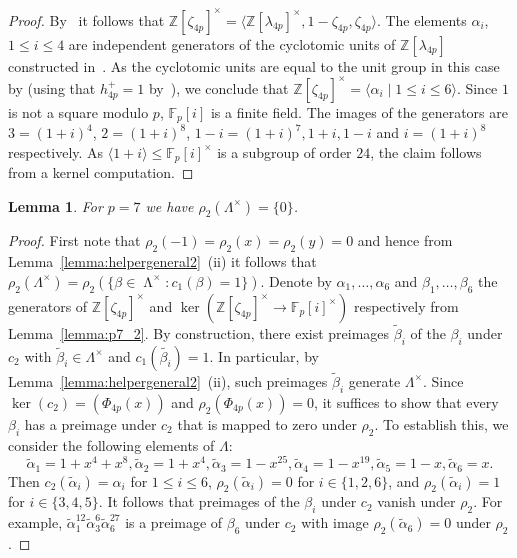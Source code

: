 \documentclass[11pt,leqno,a4paper]{amsart}
\newcommand{\Z}{\mathbb{Z}}
\newcommand{\F}{\mathbb{F}}
\DeclareMathOperator{\LL}{\Lambda}
\newtheorem{lemma}[thm]{Lemma}
\theoremstyle{definition}
\theoremstyle{remark}
\theoremstyle{custom}
\begin{document}
\begin{proof}
By~\cite[Corollary 4.13]{Washington1997} it follows that $\Z[\zeta_{4p}]^\times = \langle \Z[\lambda_{4p}]^\times, 1 - \zeta_{4p}, \zeta_{4p}\rangle$.
The elements $\alpha_i$, $1 \leq i \leq 4$ are independent generators of the cyclotomic units of $\Z[\lambda_{4p}]$ constructed in~\cite{RK1989}. As the cyclotomic units are equal to the unit group in this case by \cite[Theorem]{Sinnott1978} (using that $h_{4p}^+ = 1$ by~\cite{Linden1992}), we conclude that $\Z[\zeta_{4p}]^\times = \langle \alpha_i \mid 1 \leq i \leq 6 \rangle$.
    Since $1$ is not a square modulo $p$, $\F_p[i]$ is a finite field.
    The images of the generators are $3 = (1 + i)^4$, $2 = (1 +i)^8$, $1 - i = (1 + i)^7, 1 +i, 1 -i$ and $i = (1 + i)^8$ respectively. As $\langle 1 + i \rangle \leq \F_p[i]^\times$ is a subgroup of order $24$, the claim follows from a kernel computation.
\end{proof}

\begin{lemma}\label{lemma:rho2units}
  For $p = 7$ we have $\rho_2(\Lambda^\times) = \{0\}$.
\end{lemma}

\begin{proof}
  First note that $\rho_2(-1) = \rho_2(x) = \rho_2(y) = 0$ and hence from Lemma~\ref{lemma:helpergeneral2}~(ii) it follows that $\rho_2(\Lambda^\times) = \rho_2(\{ \beta \in \LL^\times : c_1(\beta) = 1\})$.
  Denote by $\alpha_1,\dotsc,\alpha_6$ and $\beta_1,\dotsc,\beta_6$ the generators of $\Z[\zeta_{4p}]^\times$ and $\ker(\Z[\zeta_{4p}]^\times \to \F_p[i]^\times)$ respectively from Lemma~\ref{lemma:p7_2}.
  By construction, there exist preimages $\tilde \beta_i$ of the $\beta_i$ under $c_2$ with $\tilde \beta_i \in \Lambda^\times$ and $c_1(\tilde{\beta_i}) = 1$. In particular, by Lemma~\ref{lemma:helpergeneral2}~(ii), such preimages $\tilde \beta_i$ generate $\Lambda^\times$.
  Since $\ker(c_2) = (\Phi_{4p}(x))$ and $\rho_2(\Phi_{4p}(x)) = 0$, it suffices to show that every $\beta_i$ has a preimage under $c_2$ that is mapped to zero under $\rho_2$.
  To establish this, we consider the following elements of $\Lambda$:
  \[ \tilde{\alpha}_1 = 1 + x^4 + x^8, \tilde{\alpha}_2 = 1 + x^4, \tilde{\alpha}_3 = 1 - x^{25}, \tilde\alpha_4 = 1 - x^{19}, \tilde\alpha_5 = 1 - x, \tilde{\alpha}_6 = x. \] 
  Then $c_2(\tilde{\alpha}_i) = \alpha_i$ for $1 \leq i \leq 6$, $\rho_2(\tilde{\alpha}_i) = 0$ for $i \in \{1,2,6\}$, and $\rho_2(\tilde{\alpha}_i) = 1$ for $i \in \{3,4,5\}$. 
  It follows that preimages of the $\beta_i$ under $c_2$ vanish under $\rho_2$. For example, $\tilde{\alpha}_1^{12} \tilde\alpha_3^6 \tilde\alpha_6^{27}$ is a preimage of $\beta_6$ under $c_2$ with
  image $\rho_2(\tilde \alpha_6) = 0$ under $\rho_2$.
\end{proof}
\end{document}
